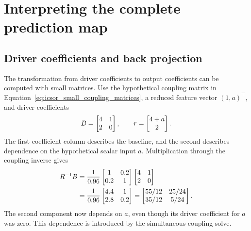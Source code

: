 \section{Interpreting the complete prediction map}

\subsection{Driver coefficients and back projection}

The transformation from driver coefficients to output coefficients can be computed with small matrices. Use the hypothetical coupling matrix in Equation~\eqref{eq:icsor_small_coupling_matrices}, a reduced feature vector \((1,a)^\top\), and driver coefficients
\begin{equation}
\equationname{Illustrative driver coefficients and operating-dependent driver}
\label{eq:icsor_small_driver_coefficient_matrix}
B=\begin{bmatrix}4&1\\2&0\end{bmatrix},
\qquad
r=\begin{bmatrix}4+a\\2\end{bmatrix}.
\end{equation}
The first coefficient column describes the baseline, and the second describes dependence on the hypothetical scalar input \(a\). Multiplication through the coupling inverse gives
\begin{equation}
\equationname{Illustrative transformation of driver coefficients through coupling}
\label{eq:icsor_small_back_projection}
\begin{aligned}
R^{-1}B
&=\frac{1}{0.96}
\begin{bmatrix}1&0.2\\0.2&1\end{bmatrix}
\begin{bmatrix}4&1\\2&0\end{bmatrix}\\
&=\frac{1}{0.96}\begin{bmatrix}4.4&1\\2.8&0.2\end{bmatrix}
=\begin{bmatrix}55/12&25/24\\35/12&5/24\end{bmatrix}.
\end{aligned}
\end{equation}
The second component now depends on \(a\), even though its driver coefficient for \(a\) was zero. This dependence is introduced by the simultaneous coupling solve.

